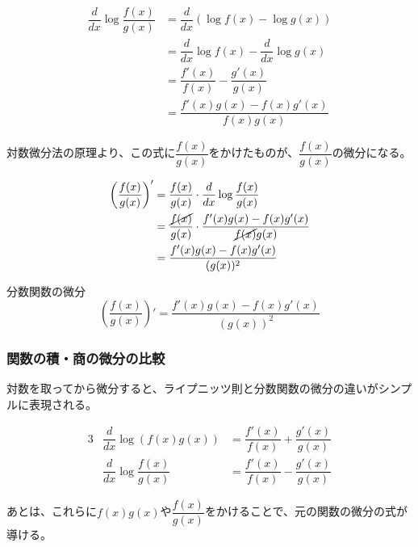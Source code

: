 \documentclass[../../imaging-math]{subfiles}
\begin{document}
\begin{align}
  \dfrac{d}{dx} \log \dfrac{f(x)}{g(x)} & = \dfrac{d}{dx} \left(\log f(x) - \log g(x)\right)  \\
                                        & = \dfrac{d}{dx} \log f(x) - \dfrac{d}{dx} \log g(x) \\
                                        & = \dfrac{f'(x)}{f(x)} - \dfrac{g'(x)}{g(x)}         \\
                                        & = \dfrac{f'(x)g(x) - f(x)g'(x)}{f(x)g(x)}
\end{align}

対数微分法の原理より、この式に$\dfrac{f(x)}{g(x)}$をかけたものが、$\dfrac{f(x)}{g(x)}$の微分になる。

\begin{align}
  \left(\dfrac{f(x)}{g(x)}\right)' & = \dfrac{f(x)}{g(x)} \cdot \dfrac{d}{dx} \log \dfrac{f(x)}{g(x)}                     \\
                                   & = \dfrac{\cancel{f(x)}}{g(x)} \cdot \dfrac{f'(x)g(x) - f(x)g'(x)}{\cancel{f(x)}g(x)} \\
                                   & = \dfrac{f'(x)g(x) - f(x)g'(x)}{(g(x))^2}
\end{align}

\begin{theorem}{分数関数の微分}
  \LARGE
  \begin{equation}
    \left(\dfrac{f(x)}{g(x)}\right)' = \dfrac{f'(x)g(x) - f(x)g'(x)}{(g(x))^2}
  \end{equation}
\end{theorem}

\subsubsection{関数の積・商の微分の比較}

対数を取ってから微分すると、ライプニッツ則と分数関数の微分の違いがシンプルに表現される。

\begin{alignat}{3}
   & \dfrac{d}{dx} \log \left(f(x)g(x)\right) & = \dfrac{f'(x)}{f(x)} + \dfrac{g'(x)}{g(x)} \\
   & \dfrac{d}{dx} \log \dfrac{f(x)}{g(x)}    & = \dfrac{f'(x)}{f(x)} - \dfrac{g'(x)}{g(x)}
\end{alignat}

あとは、これらに$f(x)g(x)$や$\dfrac{f(x)}{g(x)}$をかけることで、元の関数の微分の式が導ける。
\end{document}

